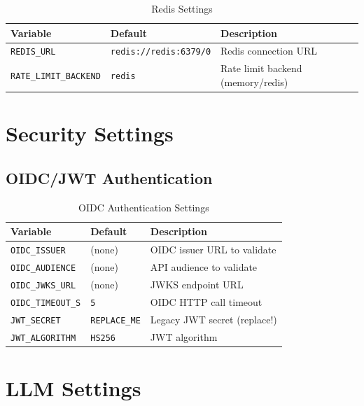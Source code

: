 \documentclass[a4paper,twoside]{sapthesis}
\begin{document}
\begin{table}[ht]
\centering
\caption{Redis Settings}
\label{tab:config-redis}
\small
\begin{tabularx}{\textwidth}{llX}
    \hline
    \textbf{Variable} & \textbf{Default} & \textbf{Description} \\
    \hline
    \texttt{REDIS\_URL} & \texttt{redis://redis:6379/0} & Redis connection URL \\
    \texttt{RATE\_LIMIT\_BACKEND} & \texttt{redis} & Rate limit backend (memory/redis) \\
    \hline
\end{tabularx}
\end{table}

\section{Security Settings}
\label{app:config:security}

\subsection{OIDC/JWT Authentication}

\begin{table}[ht]
\centering
\caption{OIDC Authentication Settings}
\label{tab:config-oidc}
\small
\begin{tabularx}{\textwidth}{llX}
    \hline
    \textbf{Variable} & \textbf{Default} & \textbf{Description} \\
    \hline
    \texttt{OIDC\_ISSUER} & (none) & OIDC issuer URL to validate \\
    \texttt{OIDC\_AUDIENCE} & (none) & API audience to validate \\
    \texttt{OIDC\_JWKS\_URL} & (none) & JWKS endpoint URL \\
    \texttt{OIDC\_TIMEOUT\_S} & \texttt{5} & OIDC HTTP call timeout \\
    \texttt{JWT\_SECRET} & \texttt{REPLACE\_ME} & Legacy JWT secret (replace!) \\
    \texttt{JWT\_ALGORITHM} & \texttt{HS256} & JWT algorithm \\
    \hline
\end{tabularx}
\end{table}

\section{LLM Settings}
\label{app:config:llm}
\end{document}
